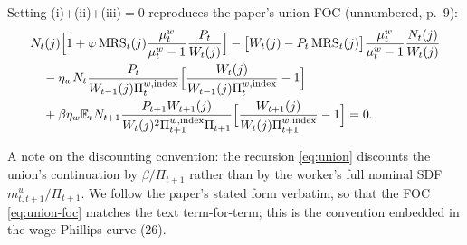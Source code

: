 Setting (i)+(ii)+(iii)$=0$ reproduces the paper's union FOC (unnumbered, p.\ 9):
\begin{align}
&N_t(j)\Big[1+\varphi\operatorname{MRS}_t(j)\frac{\mu^w_t}{\mu^w_t-1}\frac{P_t}{W_t(j)}\Big]
-\big[W_t(j)-P_t\operatorname{MRS}_t(j)\big]\frac{\mu^w_t}{\mu^w_t-1}\frac{N_t(j)}{W_t(j)}\nonumber\\
&\quad-\eta_wN_t\frac{P_t}{W_{t-1}(j)\Pi^{w,\text{index}}_t}\Big[\frac{W_t(j)}{W_{t-1}(j)\Pi^{w,\text{index}}_t}-1\Big]\nonumber\\
&\quad+\beta\eta_w\mathbb{E}_tN_{t+1}\frac{P_{t+1}W_{t+1}(j)}{W_t(j)^2\Pi^{w,\text{index}}_{t+1}\Pi_{t+1}}
\Big[\frac{W_{t+1}(j)}{W_t(j)\Pi^{w,\text{index}}_{t+1}}-1\Big]=0.\label{eq:union-foc}
\end{align}

\medskip\noindent
A note on the discounting convention: the recursion \eqref{eq:union} discounts the union's continuation
by $\beta/\Pi_{t+1}$ rather than by the worker's full nominal SDF $m^w_{t,t+1}/\Pi_{t+1}$. We follow the
paper's stated form verbatim, so that the FOC \eqref{eq:union-foc} matches the text term-for-term; this
is the convention embedded in the wage Phillips curve (26).

